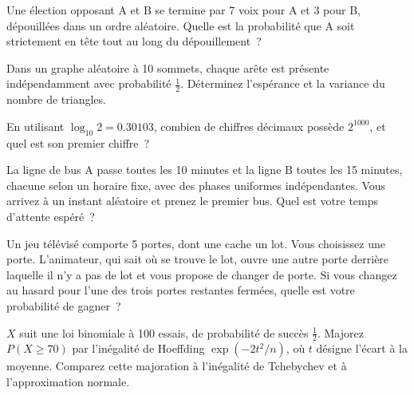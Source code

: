 
\begin{question}\label{iq:iv1:timed-test-5:7}
Une élection opposant A et B se termine par 7 voix pour A et 3 pour B, dépouillées dans un ordre aléatoire. Quelle est la probabilité que A soit strictement en tête tout au long du dépouillement~?
\end{question}

\begin{question}\label{iq:iv1:timed-test-5:8}
Dans un graphe aléatoire à 10 sommets, chaque arête est présente indépendamment avec probabilité $\frac12$. Déterminez l'espérance et la variance du nombre de triangles.
\end{question}

\begin{question}\label{iq:iv1:timed-test-5:9}
En utilisant $\log_{10}2 = 0.30103$, combien de chiffres décimaux possède $2^{1000}$, et quel est son premier chiffre~?
\end{question}

\begin{question}\label{iq:iv1:timed-test-5:10}
La ligne de bus A passe toutes les 10 minutes et la ligne B toutes les 15 minutes, chacune selon un horaire fixe, avec des phases uniformes indépendantes. Vous arrivez à un instant aléatoire et prenez le premier bus. Quel est votre temps d'attente espéré~?
\end{question}

\begin{question}\label{iq:iv1:timed-test-5:11}
Un jeu télévisé comporte 5 portes, dont une cache un lot. Vous choisissez une porte. L'animateur, qui sait où se trouve le lot, ouvre une autre porte derrière laquelle il n'y a pas de lot et vous propose de changer de porte. Si vous changez au hasard pour l'une des trois portes restantes fermées, quelle est votre probabilité de gagner~?
\end{question}

\begin{question}\label{iq:iv1:timed-test-5:12}
$X$ suit une loi binomiale à 100 essais, de probabilité de succès $\frac12$. Majorez $P(X \ge 70)$ par l'inégalité de Hoeffding $\exp(-2t^2/n)$, où $t$ désigne l'écart à la moyenne. Comparez cette majoration à l'inégalité de Tchebychev et à l'approximation normale.
\end{question}
